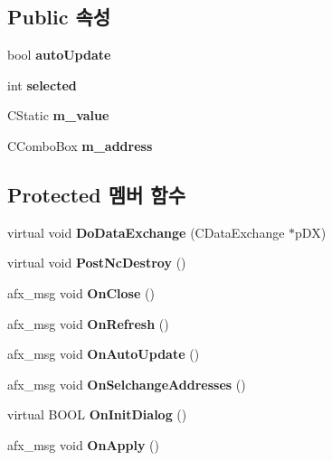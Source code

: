 \subsection*{Public 속성}
\begin{DoxyCompactItemize}
\item 
\mbox{\label{class_i_o_viewer_a6f3bc2241e369ffba682365f58412dc7}} 
bool {\bfseries auto\+Update}
\item 
\mbox{\label{class_i_o_viewer_a418dd29c924f6fa180e995ba9db8399c}} 
int {\bfseries selected}
\item 
\mbox{\label{class_i_o_viewer_aeb772ac65eb0a1c472473b2436b83728}} 
C\+Static {\bfseries m\+\_\+value}
\item 
\mbox{\label{class_i_o_viewer_ab381b72aee2da8c7f3c25ba58c69c3cd}} 
C\+Combo\+Box {\bfseries m\+\_\+address}
\end{DoxyCompactItemize}
\subsection*{Protected 멤버 함수}
\begin{DoxyCompactItemize}
\item 
\mbox{\label{class_i_o_viewer_aac7d35447b8dc9a733a772d67626a9a6}} 
virtual void {\bfseries Do\+Data\+Exchange} (C\+Data\+Exchange $\ast$p\+DX)
\item 
\mbox{\label{class_i_o_viewer_aba88a6282cb5c6e57cd169a1821182be}} 
virtual void {\bfseries Post\+Nc\+Destroy} ()
\item 
\mbox{\label{class_i_o_viewer_a99c1044f4eed5c69ca652edfc032289d}} 
afx\+\_\+msg void {\bfseries On\+Close} ()
\item 
\mbox{\label{class_i_o_viewer_a1a50f763e39ff7672a2665ab23e44ee7}} 
afx\+\_\+msg void {\bfseries On\+Refresh} ()
\item 
\mbox{\label{class_i_o_viewer_a8e9ae4ebf837dff76500534337c0d609}} 
afx\+\_\+msg void {\bfseries On\+Auto\+Update} ()
\item 
\mbox{\label{class_i_o_viewer_a406130e0b8572721cf8ede30d2005fa2}} 
afx\+\_\+msg void {\bfseries On\+Selchange\+Addresses} ()
\item 
\mbox{\label{class_i_o_viewer_a4d36007016944a2ed21ee72323204f00}} 
virtual B\+O\+OL {\bfseries On\+Init\+Dialog} ()
\item 
\mbox{\label{class_i_o_viewer_ab90a9bf33360f3410ea2d1341b61e6d9}} 
afx\+\_\+msg void {\bfseries On\+Apply} ()
\end{DoxyCompactItemize}



